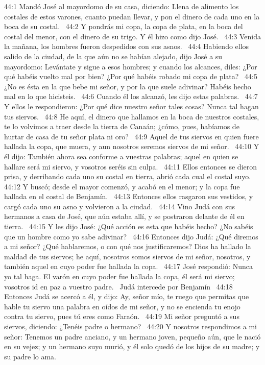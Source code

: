 44:1 Mandó José al mayordomo de su casa, diciendo: Llena de alimento los costales de estos varones, cuanto puedan llevar, y pon el dinero de cada uno en la boca de su costal.  
44:2 Y pondrás mi copa, la copa de plata, en la boca del costal del menor, con el dinero de su trigo. Y él hizo como dijo José.  
44:3 Venida la mañana, los hombres fueron despedidos con sus asnos.  
44:4 Habiendo ellos salido de la ciudad, de la que aún no se habían alejado, dijo José a su mayordomo: Levántate y sigue a esos hombres; y cuando los alcances, diles: ¿Por qué habéis vuelto mal por bien? ¿Por qué habéis robado mi copa de plata?  
44:5 ¿No es ésta en la que bebe mi señor, y por la que suele adivinar? Habéis hecho mal en lo que hicisteis.  
44:6 Cuando él los alcanzó, les dijo estas palabras.  
44:7 Y ellos le respondieron: ¿Por qué dice nuestro señor tales cosas? Nunca tal hagan tus siervos.  
44:8 He aquí, el dinero que hallamos en la boca de nuestros costales, te lo volvimos a traer desde la tierra de Canaán; ¿cómo, pues, habíamos de hurtar de casa de tu señor plata ni oro?  
44:9 Aquel de tus siervos en quien fuere hallada la copa, que muera, y aun nosotros seremos siervos de mi señor.  
44:10 Y él dijo: También ahora sea conforme a vuestras palabras; aquel en quien se hallare será mi siervo, y vosotros seréis sin culpa.  
44:11 Ellos entonces se dieron prisa, y derribando cada uno su costal en tierra, abrió cada cual el costal suyo. 
44:12 Y buscó; desde el mayor comenzó, y acabó en el menor; y la copa fue hallada en el costal de Benjamín.  
44:13 Entonces ellos rasgaron sus vestidos, y cargó cada uno su asno y volvieron a la ciudad.  
44:14 Vino Judá con sus hermanos a casa de José, que aún estaba allí, y se postraron delante de él en tierra.  
44:15 Y les dijo José: ¿Qué acción es esta que habéis hecho? ¿No sabéis que un hombre como yo sabe adivinar?  
44:16 Entonces dijo Judá: ¿Qué diremos a mi señor? ¿Qué hablaremos, o con qué nos justificaremos? Dios ha hallado la maldad de tus siervos; he aquí, nosotros somos siervos de mi señor, nosotros, y también aquel en cuyo poder fue hallada la copa.  
44:17 José respondió: Nunca yo tal haga. El varón en cuyo poder fue hallada la copa, él será mi siervo; vosotros id en paz a vuestro padre.  
Judá intercede por Benjamín  
44:18 Entonces Judá se acercó a él, y dijo: Ay, señor mío, te ruego que permitas que hable tu siervo una palabra en oídos de mi señor, y no se encienda tu enojo contra tu siervo, pues tú eres como Faraón.  
44:19 Mi señor preguntó a sus siervos, diciendo: ¿Tenéis padre o hermano?  
44:20 Y nosotros respondimos a mi señor: Tenemos un padre anciano, y un hermano joven, pequeño aún, que le nació en su vejez; y un hermano suyo murió, y él solo quedó de los hijos de su madre; y su padre lo ama.  
